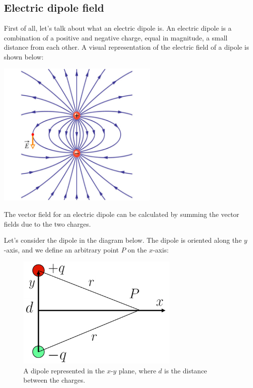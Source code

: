 \documentclass[
  letterpaper,
  DIV=11,
  numbers=noendperiod]{scrreprt}
\begin{document}
\subsection{Electric dipole field}\label{electric-dipole-field}

First of all, let's talk about what an electric dipole is. An electric
dipole is a combination of a positive and negative charge, equal in
magnitude, a small distance from each other. A visual representation of
the electric field of a dipole is shown below:

\includegraphics[width=3.125in,height=\textheight]{Figures/dipole_field.png}

The vector field for an electric dipole can be calculated by summing the
vector fields due to the two charges.

Let's consider the dipole in the diagram below. The dipole is oriented
along the \(y\)-axis, and we define an arbitrary point \(P\) on the
\(x\)-axis:

\begin{figure}[H]

{\centering \includegraphics[width=3.125in,height=\textheight]{Figures/dipole_diagram.png}

}

\caption{A dipole represented in the \(x\)-\(y\) plane, where \(d\) is
the distance between the charges.}

\end{figure}%
\end{document}
